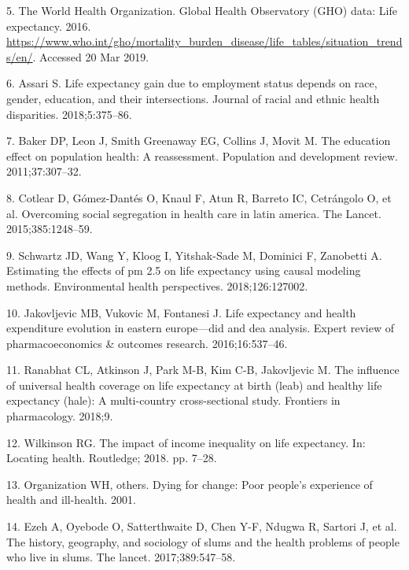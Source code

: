 \documentclass[]{elsarticle} %
\begin{document}
\leavevmode\hypertarget{ref-WHOobserve}{}%
5. The World Health Organization. Global Health Observatory (GHO) data: Life expectancy. 2016. \url{https://www.who.int/gho/mortality_burden_disease/life_tables/situation_trends/en/}. Accessed 20 Mar 2019.

\leavevmode\hypertarget{ref-assari2018life}{}%
6. Assari S. Life expectancy gain due to employment status depends on race, gender, education, and their intersections. Journal of racial and ethnic health disparities. 2018;5:375--86.

\leavevmode\hypertarget{ref-baker2011education}{}%
7. Baker DP, Leon J, Smith Greenaway EG, Collins J, Movit M. The education effect on population health: A reassessment. Population and development review. 2011;37:307--32.

\leavevmode\hypertarget{ref-cotlear2015overcoming}{}%
8. Cotlear D, Gómez-Dantés O, Knaul F, Atun R, Barreto IC, Cetrángolo O, et al. Overcoming social segregation in health care in latin america. The Lancet. 2015;385:1248--59.

\leavevmode\hypertarget{ref-schwartz2018estimating}{}%
9. Schwartz JD, Wang Y, Kloog I, Yitshak-Sade M, Dominici F, Zanobetti A. Estimating the effects of pm 2.5 on life expectancy using causal modeling methods. Environmental health perspectives. 2018;126:127002.

\leavevmode\hypertarget{ref-jakovljevic2016life}{}%
10. Jakovljevic MB, Vukovic M, Fontanesi J. Life expectancy and health expenditure evolution in eastern europe---did and dea analysis. Expert review of pharmacoeconomics \& outcomes research. 2016;16:537--46.

\leavevmode\hypertarget{ref-ranabhat2018influence}{}%
11. Ranabhat CL, Atkinson J, Park M-B, Kim C-B, Jakovljevic M. The influence of universal health coverage on life expectancy at birth (leab) and healthy life expectancy (hale): A multi-country cross-sectional study. Frontiers in pharmacology. 2018;9.

\leavevmode\hypertarget{ref-wilkinson2018impact}{}%
12. Wilkinson RG. The impact of income inequality on life expectancy. In: Locating health. Routledge; 2018. pp. 7--28.

\leavevmode\hypertarget{ref-world2001dying}{}%
13. Organization WH, others. Dying for change: Poor people's experience of health and ill-health. 2001.

\leavevmode\hypertarget{ref-ezeh2017history}{}%
14. Ezeh A, Oyebode O, Satterthwaite D, Chen Y-F, Ndugwa R, Sartori J, et al. The history, geography, and sociology of slums and the health problems of people who live in slums. The lancet. 2017;389:547--58.
\end{document}
